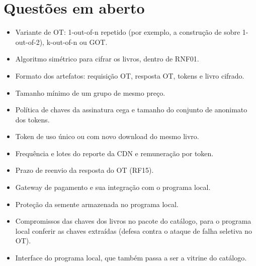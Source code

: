 \documentclass[12pt, oneside, a4paper, english, brazil]{abntex2}
\begin{document}
\section{Questões em aberto}

\begin{itemize}
\item Variante de OT: 1-out-of-n repetido (por exemplo, a construção de
 sobre 1-out-of-2), k-out-of-n ou GOT.
\item Algoritmo simétrico para cifrar os livros, dentro de RNF01.
\item Formato dos artefatos: requisição OT, resposta OT, tokens e livro
cifrado.
\item Tamanho mínimo de um grupo de mesmo preço.
\item Política de chaves da assinatura cega e tamanho do conjunto de
anonimato dos tokens.
\item Token de uso único ou com novo download do mesmo livro.
\item Frequência e lotes do reporte da CDN e remuneração por token.
\item Prazo de reenvio da resposta do OT (RF15).
\item Gateway de pagamento e sua integração com o programa local.
\item Proteção da semente armazenada no programa local.
\item Compromissos das chaves dos livros no pacote do catálogo, para o
programa local conferir as chaves extraídas (defesa contra o ataque de falha
seletiva no OT).
\item Interface do programa local, que também passa a ser a vitrine do
catálogo.
\end{itemize}

\postextual

\end{document}

